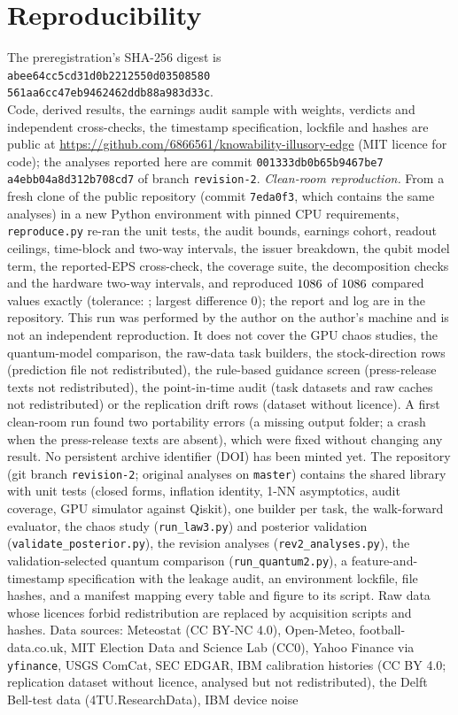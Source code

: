 \documentclass[journal]{IEEEtran}
\theoremstyle{definition}
\begin{document}
\section{Reproducibility}\label{app:repro}
The preregistration's SHA-256 digest is\\
\texttt{\small abee64cc5cd31d0b2212550d03508580}\\
\texttt{\small 561aa6cc47eb9462462ddb88a983d33c}.\\
Code, derived results, the earnings audit sample with weights, verdicts and independent cross-checks, the timestamp specification, lockfile and hashes are public at \url{https://github.com/6866561/knowability-illusory-edge} (MIT licence for code); the analyses reported here are commit \texttt{\small 001333db0b65b9467be7}\\
\texttt{\small a4ebb04a8d312b708cd7} of branch \texttt{revision-2}. \emph{Clean-room reproduction.} From a fresh clone of the public repository (commit \texttt{7eda0f3}, which contains the same analyses) in a new Python environment with pinned CPU requirements, \texttt{reproduce.py} re-ran the unit tests, the audit bounds, earnings cohort, readout ceilings, time-block and two-way intervals, the issuer breakdown, the qubit model term, the reported-EPS cross-check, the coverage suite, the decomposition checks and the hardware two-way intervals, and reproduced $1086$ of $1086$ compared values exactly (tolerance: \rpTol; largest difference $0$); the report and log are in the repository. This run was performed by the author on the author's machine and is not an independent reproduction. It does not cover the GPU chaos studies, the quantum-model comparison, the raw-data task builders, the stock-direction rows (prediction file not redistributed), the rule-based guidance screen (press-release texts not redistributed), the point-in-time audit (task datasets and raw caches not redistributed) or the replication drift rows (dataset without licence). A first clean-room run found two portability errors (a missing output folder; a crash when the press-release texts are absent), which were fixed without changing any result. No persistent archive identifier (DOI) has been minted yet. The repository (git branch \texttt{revision-2}; original analyses on \texttt{master}) contains the shared library with unit tests (closed forms, inflation identity, 1-NN asymptotics, audit coverage, GPU simulator against Qiskit), one builder per task, the walk-forward evaluator, the chaos study (\texttt{run\_law3.py}) and posterior validation (\texttt{validate\_posterior.py}), the revision analyses (\texttt{rev2\_analyses.py}), the validation-selected quantum comparison (\texttt{run\_quantum2.py}), a feature-and-timestamp specification with the leakage audit, an environment lockfile, file hashes, and a manifest mapping every table and figure to its script. Raw data whose licences forbid redistribution are replaced by acquisition scripts and hashes. Data sources: Meteostat (CC BY-NC 4.0), Open-Meteo, football-data.co.uk, MIT Election Data and Science Lab (CC0), Yahoo Finance via \texttt{yfinance}, USGS ComCat, SEC EDGAR, IBM calibration histories (CC BY 4.0; replication dataset without licence, analysed but not redistributed), the Delft Bell-test data (4TU.ResearchData), IBM device noise 
\end{document}
